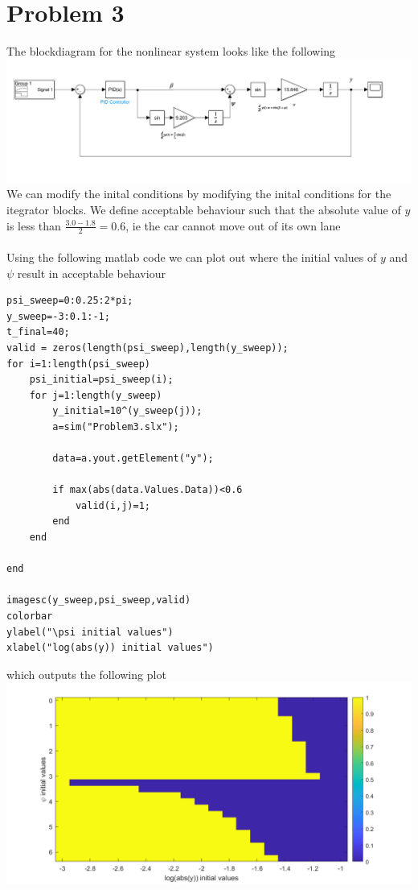 \documentclass[12pt]{article}
\begin{document}
\section*{Problem 3}
The blockdiagram for the nonlinear system looks like the following\\
\includegraphics[scale=0.4]{Problem3BlockDiagram.PNG}\\
We can modify the inital conditions by modifying the inital conditions for the itegrator blocks. We define acceptable behaviour such that the absolute value of $y$ is less than
$\frac{3.0-1.8}{2}=0.6$, ie the car cannot move out of its own lane
\\\\
Using the following matlab code we can plot out where the initial values of $y$ and $\psi$ result in acceptable behaviour
\begin{verbatim}
psi_sweep=0:0.25:2*pi;
y_sweep=-3:0.1:-1;
t_final=40;
valid = zeros(length(psi_sweep),length(y_sweep));
for i=1:length(psi_sweep)
    psi_initial=psi_sweep(i);
    for j=1:length(y_sweep)
        y_initial=10^(y_sweep(j));
        a=sim("Problem3.slx");

        data=a.yout.getElement("y");
        
        if max(abs(data.Values.Data))<0.6
            valid(i,j)=1;
        end
    end

end

imagesc(y_sweep,psi_sweep,valid)
colorbar
ylabel("\psi initial values")
xlabel("log(abs(y)) initial values")
\end{verbatim}
which outputs the following plot\\
\includegraphics[scale=0.4]{Problem3Fig1.png}\\
\end{document}

